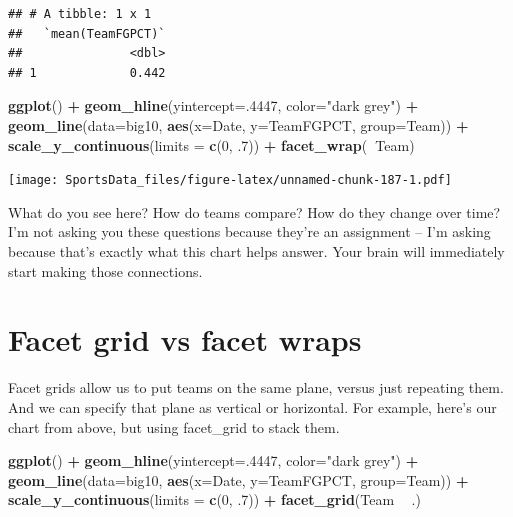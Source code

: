 \documentclass[]{book}
\newenvironment{Shaded}{\begin{snugshade}}{\end{snugshade}}
\newcommand{\KeywordTok}[1]{\textcolor[rgb]{0.13,0.29,0.53}{\textbf{#1}}}
\newcommand{\DataTypeTok}[1]{\textcolor[rgb]{0.13,0.29,0.53}{#1}}
\newcommand{\DecValTok}[1]{\textcolor[rgb]{0.00,0.00,0.81}{#1}}
\newcommand{\StringTok}[1]{\textcolor[rgb]{0.31,0.60,0.02}{#1}}
\newcommand{\OperatorTok}[1]{\textcolor[rgb]{0.81,0.36,0.00}{\textbf{#1}}}
\newcommand{\NormalTok}[1]{#1}
\begin{document}
\begin{verbatim}
## # A tibble: 1 x 1
##   `mean(TeamFGPCT)`
##               <dbl>
## 1             0.442
\end{verbatim}

\begin{Shaded}
\begin{Highlighting}[]
\KeywordTok{ggplot}\NormalTok{() }\OperatorTok{+}\StringTok{ }\KeywordTok{geom_hline}\NormalTok{(}\DataTypeTok{yintercept=}\NormalTok{.}\DecValTok{4447}\NormalTok{, }\DataTypeTok{color=}\StringTok{"dark grey"}\NormalTok{) }\OperatorTok{+}\StringTok{ }\KeywordTok{geom_line}\NormalTok{(}\DataTypeTok{data=}\NormalTok{big10, }\KeywordTok{aes}\NormalTok{(}\DataTypeTok{x=}\NormalTok{Date, }\DataTypeTok{y=}\NormalTok{TeamFGPCT, }\DataTypeTok{group=}\NormalTok{Team)) }\OperatorTok{+}\StringTok{ }\KeywordTok{scale_y_continuous}\NormalTok{(}\DataTypeTok{limits =} \KeywordTok{c}\NormalTok{(}\DecValTok{0}\NormalTok{, .}\DecValTok{7}\NormalTok{)) }\OperatorTok{+}\StringTok{ }\KeywordTok{facet_wrap}\NormalTok{(}\OperatorTok{~}\NormalTok{Team)}
\end{Highlighting}
\end{Shaded}

\texttt{[image: SportsData\_files/figure-latex/unnamed-chunk-187-1.pdf]}

What do you see here? How do teams compare? How do they change over
time? I'm not asking you these questions because they're an assignment
-- I'm asking because that's exactly what this chart helps answer. Your
brain will immediately start making those connections.

\section{Facet grid vs facet wraps}\label{facet-grid-vs-facet-wraps}

Facet grids allow us to put teams on the same plane, versus just
repeating them. And we can specify that plane as vertical or horizontal.
For example, here's our chart from above, but using facet\_grid to stack
them.

\begin{Shaded}
\begin{Highlighting}[]
\KeywordTok{ggplot}\NormalTok{() }\OperatorTok{+}\StringTok{ }\KeywordTok{geom_hline}\NormalTok{(}\DataTypeTok{yintercept=}\NormalTok{.}\DecValTok{4447}\NormalTok{, }\DataTypeTok{color=}\StringTok{"dark grey"}\NormalTok{) }\OperatorTok{+}\StringTok{ }\KeywordTok{geom_line}\NormalTok{(}\DataTypeTok{data=}\NormalTok{big10, }\KeywordTok{aes}\NormalTok{(}\DataTypeTok{x=}\NormalTok{Date, }\DataTypeTok{y=}\NormalTok{TeamFGPCT, }\DataTypeTok{group=}\NormalTok{Team)) }\OperatorTok{+}\StringTok{ }\KeywordTok{scale_y_continuous}\NormalTok{(}\DataTypeTok{limits =} \KeywordTok{c}\NormalTok{(}\DecValTok{0}\NormalTok{, .}\DecValTok{7}\NormalTok{)) }\OperatorTok{+}\StringTok{ }\KeywordTok{facet_grid}\NormalTok{(Team }\OperatorTok{~}\StringTok{ }\NormalTok{.)}
\end{Highlighting}
\end{Shaded}
\end{document}
